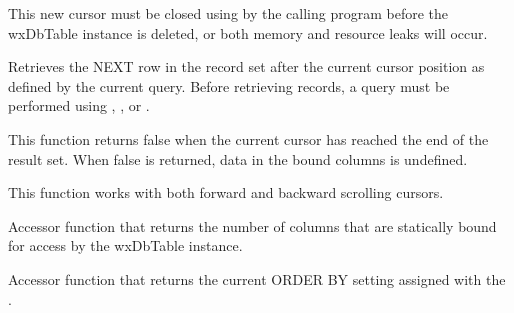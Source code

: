 


This new cursor must be closed using
by the calling program before the wxDbTable instance is deleted, or both
memory and resource leaks will occur.

\label{wxdbtablegetnext}


Retrieves the NEXT row in the record set after the current cursor position
as defined by the current query.  Before retrieving records, a query must be
performed using ,
,
 or
.


This function returns false when the current cursor has reached the end of
the result set.  When false is returned, data in the bound columns is
undefined.


This function works with both forward and backward scrolling cursors.


\label{wxdbtablegetnumberofcolumns}


Accessor function that returns the number of columns that are statically
bound for access by the wxDbTable instance.

\label{wxdbtablegetorderbyclause}


Accessor function that returns the current ORDER BY setting assigned with
the .

